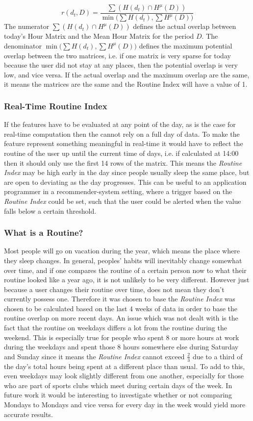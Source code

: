 $$r(d_t, D) = \frac{\sum (H(d_t) \cap H^{\mu} (D) )}{\min \Big(\sum H(d_t), \sum H^{\mu} (D) \Big)}$$
The numerator $\sum (H(d_t) \cap H^{\mu} (D) )$ defines the actual overlap between today's Hour Matrix and the Mean Hour Matrix for the period $D$. The denominator $\min \Big(\sum H(d_t), \sum H^{\mu} (D) \Big)$ defines the maximum potential overlap between the two matrices, i.e. if one matrix is very sparse for today because the user did not stay at any places, then the potential overlap is very low, and vice versa. If the actual overlap and the maximum overlap are the same, it means the matrices are the same and the Routine Index will have a value of 1. 


\subsubsection*{Real-Time Routine Index}
If the features have to be evaluated at any point of the day, as is the case for real-time computation then the  cannot rely on a full day of data. To make the feature represent something meaningful in real-time it would have to reflect the routine of the user up until the current time of days, i.e. if calculated at 14:00 then it should only use the first 14 rows of the matrix. This means the \textit{Routine Index} may be high early in the day since people usually sleep the same place, but are open to deviating as the day progresses. This can be useful to an application programmer in a recommender-system setting, where a trigger based on the \textit{Routine Index} could be set, such that the user could be alerted when the value falls below a certain threshold.

\subsubsection*{What is a Routine?}
Most people will go on vacation during the year, which means the place where they sleep changes. In general, peoples' habits will inevitably change somewhat over time, and if one compares the routine of a certain person now to what their routine looked like a year ago, it is not unlikely to be very different. However just because a user changes their routine over time, does not mean they don't currently possess one. Therefore it was chosen to base the \textit{Routine Index} was chosen to be calculated based on the last 4 weeks of data in order to base the routine overlap on more recent days. An issue which was not dealt with is the fact that the routine on weekdays differs a lot from the routine during the weekend. This is especially true for people who spent 8 or more hours at work during the weekdays and spent those 8 hours somewhere else during Saturday and Sunday since it means the \textit{Routine Index} cannot exceed $\frac{2}{3}$ due to a third of the day's total hours being spent at a different place than usual. To add to this, even weekdays may look slightly different from one another, especially for those who are part of sports clubs which meet during certain days of the week. In future work it would be interesting to investigate whether or not comparing Mondays to Mondays and vice versa for every day in the week would yield more accurate results.

